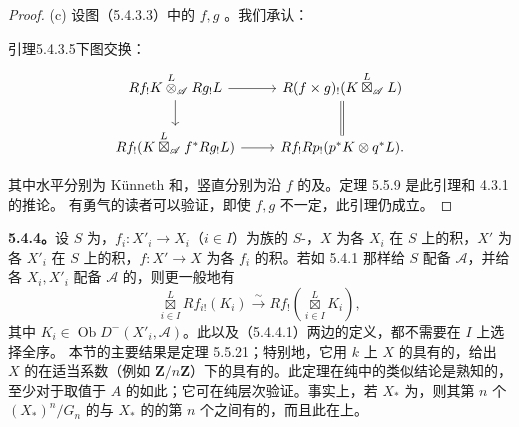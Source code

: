 \begin{proof}
(c) 设图（5.4.3.3）中的 $f,g$ 。我们承认：
\begin{SGAresult}{引理}{5.4.3.5}下图交换：
\[\begin{tikzcd}
Rf_!K\overset L\otimes_{\mathscr A}Rg_!L\arrow[r]\arrow[d]&R(f\times g)_!(K\overset L\boxtimes_{\mathscr A}L)\arrow[d,equal]\\
Rf_!(K\overset L\boxtimes_{\mathscr A}f^*Rg_!L)\arrow[r]&Rf_!Rp_!(p^*K\otimes q^*L).
\end{tikzcd}\]
\end{SGAresult}
其中水平分别为 Künneth 和，竖直分别为沿 $f$ 的及。定理 5.5.9 是此引理和 4.3.1 的推论。
有勇气的读者可以验证，即使 $f,g$ 不一定，此引理仍成立。
\end{proof}
\textbf{5.4.4。}设 $S$ 为，$f_i:X'_i\to X_i$（$i\in I$）为族的 $S$-，$X$ 为各 $X_i$ 在 $S$ 上的积，$X'$ 为各 $X'_i$ 在 $S$ 上的积，$f:X'\to X$ 为各 $f_i$ 的积。若如 5.4.1 那样给 $S$ 配备 $\mathscr A$，并给各 $X_i,X'_i$ 配备 $\mathscr A$ 的，则更一般地有
\begin{equation}\tag{5.4.4.1}
\mathop{\boxtimes}\limits_{i\in I}^{L}Rf_{i!}(K_i)\xrightarrow\sim Rf_!\left(\mathop{\boxtimes}\limits_{i\in I}^{L}K_i\right),
\end{equation}
其中 $K_i\in\operatorname{Ob}D^-(X'_i,\mathscr A)$。此以及（5.4.4.1）两边的定义，都不需要在 $I$ 上选择全序。
本节的主要结果是定理 5.5.21；特别地，它用 $k$ 上 $X$ 的具有的，给出 $X$ 的在适当系数（例如 $\mathbf Z/n\mathbf Z$）下的具有的。此定理在纯中的类似结论是熟知的，至少对于取值于 $A$ 的如此；它可在纯层次验证。事实上，若 $X_*$ 为，则其第 $n$ 个 $(X_*)^n/G_n$ 的与 $X_*$ 的的第 $n$ 个之间有的，而且此在上。

